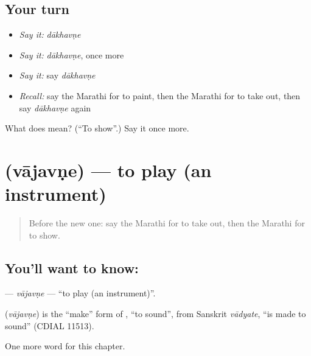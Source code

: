 \subsection*{Your turn}
\begin{itemize}
\raggedright
  \item \emph{Say it:} \emph{dākhavṇe}
  \item \emph{Say it:} \emph{dākhavṇe}, once more
  \item \emph{Say it:} say \emph{dākhavṇe}
  \item \emph{Recall:} say the Marathi for to paint, then the Marathi for to take out, then say \emph{dākhavṇe} again
\end{itemize}

\begin{tcolorbox}[breakable,colback=teal!4,colframe=teal!35!black,title={Before you move on}]
What does  mean? (\textquotedblleft{}To show\textquotedblright{}.) Say it once more.
\end{tcolorbox}
\section[\texorpdfstring{\mr{वाजवणे} (vājavṇe)}{वाजवणे (vājavṇe)}]{ (vājavṇe) — to play (an instrument)}

\label{lesson:MR-C156-vajavne}



\begin{quote}
Before the new one: say the Marathi for to take out, then the Marathi for to show.
\end{quote}

\subsection*{You'll want to know: }
\textbf{} — \emph{vājavṇe} — \textquotedblleft{}to play (an instrument)\textquotedblright{}.

\begin{cousinweb}
\textbf{} (\emph{vājavṇe}) is the \textquotedblleft{}make\textquotedblright{} form of \textbf{}, \textquotedblleft{}to sound\textquotedblright{}, from Sanskrit \emph{vādyate}, \textquotedblleft{}is made to sound\textquotedblright{} (CDIAL 11513).
\end{cousinweb}

\begin{grammarlens}[title={What you've built}]
One more word for this chapter.
\end{grammarlens}


